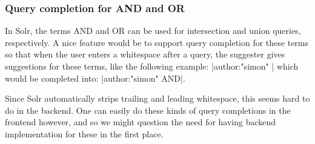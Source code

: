 \subsubsection{Query completion for AND and OR}

In Solr, the terms AND and OR can be used for intersection and union queries, respectively. 
A nice feature would be to support query completion for these terms so that when the user enters a whitespace after a query, the suggester gives suggestions for these terms, like the following example: |author:"simon" | which would be completed into: |author:"simon" AND|.

Since Solr automatically strips trailing and leading whitespace, this seems hard to do in the backend. One can easily do these kinds of query completions in the frontend however, and so we might question the need for having backend implementation for these in the first place.




